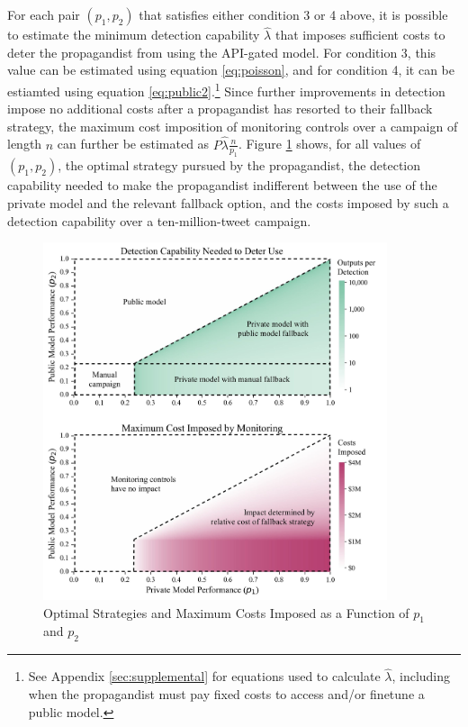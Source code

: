 \documentclass{article}
\begin{document}
For each pair $(p_1, p_2)$ that satisfies either condition 3 or 4 above, it is possible to estimate the minimum detection capability $\hat{\lambda}$ that imposes sufficient costs to deter the propagandist from using the API-gated model. For condition 3, this value can be estimated using equation \ref{eq:poisson}, and for condition 4, it can be estiamted using equation \ref{eq:public2}.\footnote{See Appendix \ref{sec:supplemental} for equations used to calculate $\hat{\lambda}$, including when the propagandist must pay fixed costs to access and/or finetune a public model.} Since further improvements in detection impose no additional costs after a propagandist has resorted to their fallback strategy, the maximum cost imposition of monitoring controls over a campaign of length $n$ can further be estimated as $P \hat{\lambda} \frac{n}{p_1}$. Figure \ref{fig:strategies} shows, for all values of $(p_1, p_2)$, the optimal strategy pursued by the propagandist, the detection capability needed to make the propagandist indifferent between the use of the private model and the relevant fallback option, and the costs imposed by such a detection capability over a ten-million-tweet campaign. 

\begin{figure}[h]
  \centering
  \includegraphics[width=0.9\textwidth]{figures/strategies_edited.jpg}
  \caption{Optimal Strategies and Maximum Costs Imposed as a Function of $p_1$ and $p_2$}
  \label{fig:strategies}
\end{figure}
\end{document}
